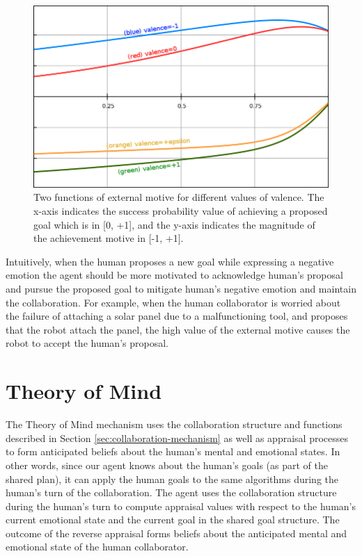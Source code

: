 \documentclass[12pt]{report}
\begin{document}
\begin{figure}[t]
  \centering
  \includegraphics[width=1\textwidth]{figure/external_motive_functions.png}
  \caption{Two functions of external motive for different values of valence. The
  x-axis indicates the success probability value of achieving a proposed goal
  which is in [0, +1], and the y-axis indicates the magnitude of the achievement
  motive in [-1, +1].}
  \label{fig:external-motive-functions}
\end{figure}

Intuitively, when the human proposes a new goal while expressing a negative
emotion the agent should be more motivated to acknowledge human's proposal and
pursue the proposed goal to mitigate human's negative emotion and maintain the
collaboration. For example, when the human collaborator is worried
about the failure of attaching a solar panel due to a malfunctioning tool,
and proposes that the robot attach the panel, the high value of the external
motive causes the robot to accept the human's proposal.

\section{Theory of Mind}
\label{sec:theory-of-mind-implementation}
The Theory of Mind mechanism uses the collaboration structure and
functions described in Section \ref{sec:collaboration-mechanism} as well as appraisal
processes to form anticipated beliefs about the human's mental and emotional
states. In other words, since our agent knows about the human's goals (as part
of the shared plan), it can apply the human goals to the same algorithms during
the human's turn of the collaboration. The agent uses the collaboration
structure during the human's turn to compute appraisal values with respect to
the human's current emotional state and the current goal in the shared goal
structure. The outcome of the reverse appraisal forms beliefs about the
anticipated mental and emotional state of the human collaborator.
\end{document}
